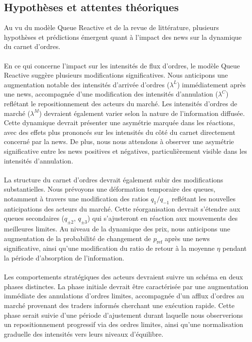\documentclass[12pt,a4paper]{article}
\theoremstyle{definition}
\theoremstyle{remark}
\begin{document}
\subsection{Hypothèses et attentes théoriques}

    Au vu du modèle Queue Reactive et de la revue de littérature, plusieurs hypothèses et prédictions émergent quant à l'impact des news sur la dynamique du carnet d'ordres.
\\
\\
    En ce qui concerne l'impact sur les intensités de flux d'ordres, le modèle Queue Reactive suggère plusieurs modifications significatives. Nous anticipons une augmentation notable des intensités d'arrivée d'ordres ($\lambda^L$) immédiatement après une news, accompagnée d'une modification des intensités d'annulation ($\lambda^C$) reflétant le repositionnement des acteurs du marché. Les intensités d'ordres de marché ($\lambda^M$) devraient également varier selon la nature de l'information diffusée. Cette dynamique devrait présenter une asymétrie marquée dans les réactions, avec des effets plus prononcés sur les intensités du côté du carnet directement concerné par la news. De plus, nous nous attendons à observer une asymétrie significative entre les news positives et négatives, particulièrement visible dans les intensités d'annulation.
\\
\\
    La structure du carnet d'ordres devrait également subir des modifications substantielles. Nous prévoyons une déformation temporaire des queues, notamment à travers une modification des ratios $q_1/q_{-1}$ reflétant les nouvelles anticipations des acteurs du marché. Cette réorganisation devrait s'étendre aux queues secondaires ($q_{\pm2}$, $q_{\pm3}$) qui s'ajusteront en réaction aux mouvements des meilleures limites. Au niveau de la dynamique des prix, nous anticipons une augmentation de la probabilité de changement de $p_{\text{ref}}$ après une news significative, ainsi qu'une modification du ratio de retour à la moyenne $\eta$ pendant la période d'absorption de l'information.
\\
\\
    Les comportements stratégiques des acteurs devraient suivre un schéma en deux phases distinctes. La phase initiale devrait être caractérisée par une augmentation immédiate des annulations d'ordres limites, accompagnée d'un afflux d'ordres au marché provenant des traders informés cherchant une exécution rapide. Cette phase serait suivie d'une période d'ajustement durant laquelle nous observerions un repositionnement progressif via des ordres limites, ainsi qu'une normalisation graduelle des intensités vers leurs niveaux d'équilibre.
\end{document}
